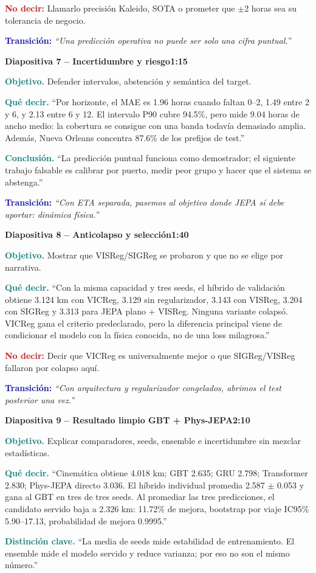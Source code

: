 \documentclass[11pt,a4paper]{article}
\newcommand{\slidehead}[3]{%
  \par\vspace{7pt}\noindent
  \colorbox{Ink}{\parbox{\dimexpr\linewidth-2\fboxsep\relax}{%
    \color{white}\textbf{Diapositiva #1 -- #2}\hfill\color{Teal!45}\textbf{#3}}}%
  \par\vspace{5pt}}
\newcommand{\cue}[1]{\textcolor{Teal}{\textbf{#1}}}
\newcommand{\avoid}[1]{\textcolor{Red}{\textbf{No decir:}} #1}
\newcommand{\transition}[1]{\textcolor{Blue}{\textbf{Transición:}} \emph{``#1''}}
\begin{document}
\avoid{Llamarlo precisión Kaleido, SOTA o prometer que $\pm$2 horas sea su tolerancia de negocio.}

\transition{Una predicción operativa no puede ser solo una cifra puntual.}

\slidehead{7}{Incertidumbre y riesgo}{1:15}
\cue{Objetivo.} Defender intervalos, abstención y semántica del target.

\cue{Qué decir.} ``Por horizonte, el MAE es 1.96 horas cuando faltan 0--2,
1.49 entre 2 y 6, y 2.13 entre 6 y 12. El intervalo P90 cubre
94.5\%, pero mide 9.04 horas de ancho medio: la cobertura se
consigue con una banda todavía demasiado amplia. Además, Nueva Orleans concentra
87.6\% de los prefijos de test.''

\cue{Conclusión.} ``La predicción puntual funciona como demostrador; el siguiente trabajo
falsable es calibrar por puerto, medir peor grupo y hacer que el sistema se abstenga.''

\transition{Con ETA separada, pasemos al objetivo donde JEPA sí debe aportar: dinámica física.}

\slidehead{8}{Anticolapso y selección}{1:40}
\cue{Objetivo.} Mostrar que VISReg/SIGReg se probaron y que no se elige por narrativa.

\cue{Qué decir.} ``Con la misma capacidad y tres seeds, el híbrido de validación obtiene
3.124 km con VICReg, 3.129 sin regularizador, 3.143 con
VISReg, 3.204 con SIGReg y 3.313 para JEPA plano + VISReg. Ninguna
variante colapsó. VICReg gana el criterio predeclarado, pero la diferencia principal viene
de condicionar el modelo con la física conocida, no de una loss milagrosa.''

\avoid{Decir que VICReg es universalmente mejor o que SIGReg/VISReg fallaron por colapso aquí.}

\transition{Con arquitectura y regularizador congelados, abrimos el test posterior una vez.}

\slidehead{9}{Resultado limpio GBT + Phys-JEPA}{2:10}
\cue{Objetivo.} Explicar comparadores, seeds, ensemble e incertidumbre sin mezclar estadísticas.

\cue{Qué decir.} ``Cinemática obtiene 4.018 km; GBT 2.635; GRU
2.798; Transformer 2.830; Phys-JEPA directo 3.036. El híbrido
individual promedia 2.587 $\pm$ 0.053 y gana al GBT en tres de
tres seeds. Al promediar las tres predicciones, el candidato servido baja a
2.326 km: 11.72\% de mejora, bootstrap por viaje IC95\%
5.90--17.13, probabilidad de mejora 0.9995.''

\cue{Distinción clave.} ``La media de seeds mide estabilidad de entrenamiento. El ensemble
mide el modelo servido y reduce varianza; por eso no son el mismo número.''
\end{document}
